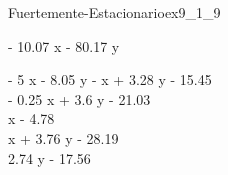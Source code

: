 
\begin{bilevelmodel}{Fuertemente-Estacionario}{ex9_1_9}
    \begin{upperlevel}{- 10.07 x - 80.17 y}{
        
    }
    \end{upperlevel}
    \begin{lowerlevel}{- 5 x - 8.05 y}{
         - x + 3.28 y - 15.45  \\ 
 - 0.25 x + 3.6 y - 21.03  \\ 
 x - 4.78  \\ 
 x + 3.76 y - 28.19  \\ 
 2.74 y - 17.56 
    }
    \end{lowerlevel}
\end{bilevelmodel}
    
        